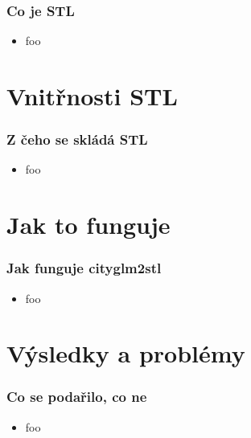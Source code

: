 \documentclass{beamer}
\begin{document}
\begin{frame}
  \frametitle{Co je STL}
    \begin{itemize}[<+->]
      \item foo
    \end{itemize}
\end{frame}

\section{Vnitřnosti STL}

\begin{frame}
  \frametitle{Z čeho se skládá STL}
    \begin{itemize}[<+->]
      \item foo
    \end{itemize}
\end{frame}

\section{Jak to funguje}

\begin{frame}
  \frametitle{Jak funguje cityglm2stl}
    \begin{itemize}[<+->]
      \item foo
    \end{itemize}
\end{frame}

\section{Výsledky a problémy}

\begin{frame}
  \frametitle{Co se podařilo, co ne}
    \begin{itemize}[<+->]
      \item foo
    \end{itemize}
\end{frame}
\end{document}
